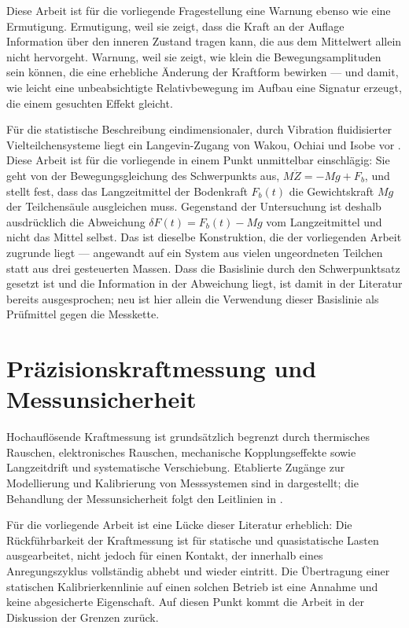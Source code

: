\documentclass[12pt,a4paper]{report}
\begin{document}
Diese Arbeit ist für die vorliegende Fragestellung eine Warnung ebenso
wie eine Ermutigung. Ermutigung, weil sie zeigt, dass die Kraft an der
Auflage Information über den inneren Zustand tragen kann, die aus dem
Mittelwert allein nicht hervorgeht. Warnung, weil sie zeigt, wie klein
die Bewegungsamplituden sein können, die eine erhebliche Änderung der
Kraftform bewirken --- und damit, wie leicht eine unbeabsichtigte
Relativbewegung im Aufbau eine Signatur erzeugt, die einem gesuchten
Effekt gleicht.

Für die statistische Beschreibung eindimensionaler, durch Vibration
fluidisierter Vielteilchensysteme liegt ein Langevin-Zugang von Wakou,
Ochiai und Isobe vor \cite{wakou2008}. Diese Arbeit ist für die
vorliegende in einem Punkt unmittelbar einschlägig: Sie geht von der
Bewegungsgleichung des Schwerpunkts aus, $M\ddot{Z} = -Mg + F_b$, und
stellt fest, dass das Langzeitmittel der Bodenkraft $F_b(t)$ die
Gewichtskraft $Mg$ der Teilchensäule ausgleichen muss. Gegenstand der
Untersuchung ist deshalb ausdrücklich die Abweichung
$\delta F(t) = F_b(t) - Mg$ vom Langzeitmittel und nicht das Mittel
selbst. Das ist dieselbe Konstruktion, die der vorliegenden Arbeit
zugrunde liegt --- angewandt auf ein System aus vielen ungeordneten
Teilchen statt aus drei gesteuerten Massen. Dass die Basislinie durch den
Schwerpunktsatz gesetzt ist und die Information in der Abweichung liegt,
ist damit in der Literatur bereits ausgesprochen; neu ist hier allein die
Verwendung dieser Basislinie als Prüfmittel gegen die Messkette.

\section{Präzisionskraftmessung und Messunsicherheit}

Hochauflösende Kraftmessung ist grundsätzlich begrenzt durch thermisches
Rauschen, elektronisches Rauschen, mechanische Kopplungseffekte sowie
Langzeitdrift und systematische Verschiebung. Etablierte Zugänge zur
Modellierung und Kalibrierung von Messsystemen sind in
\cite{beckwith2006, doebelin2004, desilva2007} dargestellt; die
Behandlung der Messunsicherheit folgt den Leitlinien
in \cite{nist1994}.

Für die vorliegende Arbeit ist eine Lücke dieser Literatur erheblich:
Die Rückführbarkeit der Kraftmessung ist für statische und
quasistatische Lasten ausgearbeitet, nicht jedoch für einen Kontakt, der
innerhalb eines Anregungszyklus vollständig abhebt und wieder
eintritt. Die Übertragung einer statischen Kalibrierkennlinie auf einen
solchen Betrieb ist eine Annahme und keine abgesicherte Eigenschaft. Auf
diesen Punkt kommt die Arbeit in der Diskussion der Grenzen zurück.
\end{document}
